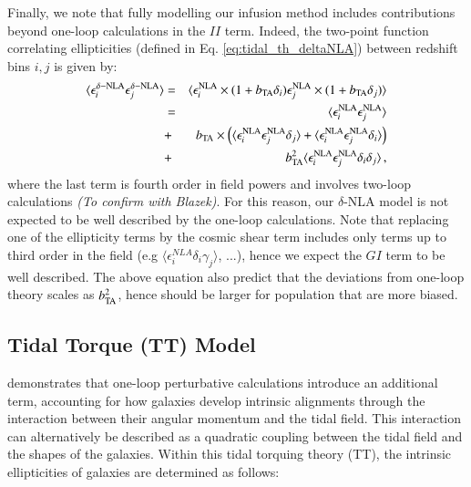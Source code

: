 Finally, we note that fully modelling our infusion method includes contributions beyond one-loop calculations in the $II$ term. Indeed, the two-point function correlating ellipticities (defined in Eq. \ref{eq:tidal_th_deltaNLA}) between redshift bins $i,j$ is given by:
 \begin{eqnarray}
\langle \epsilon_{i}^{\delta-\rm NLA} \epsilon_{j}^{\delta-\rm NLA}\rangle &=& \langle \epsilon_{i}^{\rm NLA}\times(1 + b_{\rm TA}\delta_i) \epsilon_{j}^{\rm NLA}\times(1 + b_{\rm TA}\delta_j)\rangle\\
&=& \langle \epsilon_{i}^{\rm NLA}  \epsilon_{j}^{\rm NLA}\rangle \nonumber \\
&+& b_{\rm TA} \times \left(\langle \epsilon_{i}^{\rm NLA}  \epsilon_{j}^{\rm NLA}\delta_j  \rangle + \langle \epsilon_{i}^{\rm NLA}  \epsilon_{j}^{\rm NLA}\delta_i  \rangle \right)\nonumber\\
&+& b_{\rm TA}^2 \langle \epsilon_{i}^{\rm NLA}  \epsilon_{j}^{\rm NLA}\delta_i  \delta_j \rangle \, ,
\label{eq:2pcf_deltaNLA}
\end{eqnarray}
where the last term is fourth order in field powers and involves two-loop calculations {\it (To confirm with Blazek)}. For this reason, our $\delta$-NLA model is not expected to be well described by the one-loop calculations. Note that replacing one of the ellipticity terms by the cosmic shear term includes only terms up to third order in the field (e.g $\langle \epsilon_{i}^{NLA}\delta_i \gamma_j \rangle$, ...), hence  we expect the $GI$ term to be well described. The above equation also predict that the deviations from one-loop theory scales as $b_{\rm TA}^2$, hence should be larger for population that are more biased.


\subsection{Tidal Torque (TT) Model}
\label{subsec:IA_th_TT}

\citet{TATT} demonstrates that one-loop perturbative calculations introduce an additional term, accounting for how galaxies develop intrinsic alignments through the interaction between their angular momentum and the tidal field.
This interaction can alternatively be described as a quadratic coupling between the tidal field and the shapes of the galaxies. 
Within this tidal torquing theory (TT), the intrinsic ellipticities of galaxies are determined as follows:

